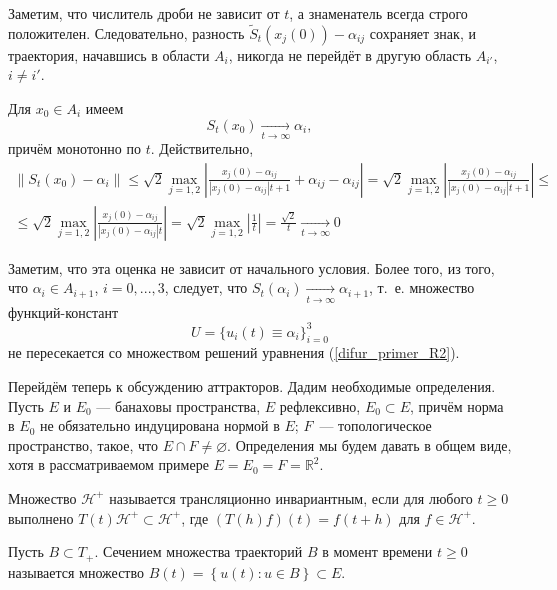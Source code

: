Заметим, что числитель дроби не зависит от $t$, а знаменатель всегда строго положителен.
Следовательно, разность $\tilde{S}_t(x_j(0)) - \alpha_{ij}$ сохраняет знак,
и траектория, начавшись в области $A_i$, никогда не перейдёт в другую область $A_{i'}$, $i \neq i'$.

Для $x_0 \in A_i$ имеем
\begin{equation}\label{primer_R2_stremlenie}
	S_t(x_0) \xrightarrow[t \to \infty]{} \alpha_{i},
\end{equation}
причём монотонно по $t$.
Действительно,
\begin{multline}
	\|S_t(x_0) - \alpha_i\| \leq
	\sqrt{2} \max_{j=1,2} \left| \frac{x_{j}(0)-\alpha_{ij}}{|x_{j}(0)-\alpha_{ij}|t+1} + \alpha_{ij} - \alpha_{ij}  \right| =
	\sqrt{2} \max_{j=1,2} \left| \frac{x_{j}(0)-\alpha_{ij}}{|x_{j}(0)-\alpha_{ij}|t+1} \right| \leq
	\\ \leq
	\sqrt{2} \max_{j=1,2} \left| \frac{x_{j}(0)-\alpha_{ij}}{|x_{j}(0)-\alpha_{ij}|t} \right| =
	\sqrt{2} \max_{j=1,2} \left| \frac{1}{t} \right| =
	\frac{\sqrt{2}}{t} \xrightarrow[t \to \infty]{} 0
\end{multline}

Заметим, что эта оценка не зависит от начального условия.
Более того, из того, что $\alpha_i \in A_{i+1}$, $i=0,...,3$,
следует, что $S_t(\alpha_i) \xrightarrow[t \to \infty]{} \alpha_{i+1}$,
т.~е. множество функций-констант
$$
	U = \{ u_i(t) \equiv \alpha_i \}_{i=0}^{3}
$$
не пересекается со множеством решений уравнения (\ref{difur_primer_R2}).

Перейдём теперь к обсуждению аттракторов.
Дадим необходимые определения.
Пусть $E$ и $E_0$ --- банаховы пространства, $E$ рефлексивно,
$E_0 \subset E$, причём норма в $E_0$ не обязательно индуцирована нормой в $E$;
$F$~--- топологическое пространство, такое, что $E \cap F \ne \varnothing$.
Определения мы будем давать в общем виде, хотя в рассматриваемом примере
$E=E_0=F=\mathbb{R}^2$.

\begin{definition}
	Множество $\mathcal{H}^+$ называется трансляционно инвариантным, если
	для любого $t \geq 0$ выполнено $T(t)\mathcal{H}^+ \subset \mathcal{H}^+$,
	где $(T(h)f)(t)=f(t+h)$ для $f \in \mathcal{H}^+$.
\end{definition}


\begin{definition}
Пусть $B \subset T_+$.
Сечением множества траекторий $B$ в момент времени $t \geq 0$ называется множество
$
	B(t)=\left\{u(t) : u \in B \right\} \subset E.
$
\end{definition}


